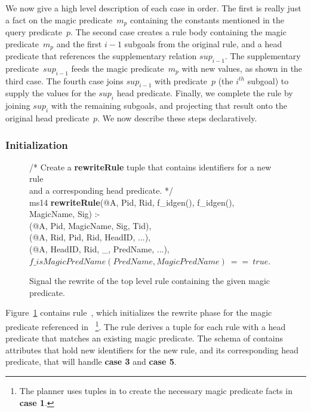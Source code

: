 We now give a high level description of each case in order.  The first is
really just a fact on the magic predicate~$m_p$ containing the constants
mentioned in the query predicate~$p$.  The second case creates a rule body
containing the magic predicate~$m_p$ and the first $i-1$ subgoals from the
original rule, and a head predicate that references the supplementary relation
$sup_{i-1}$.  The supplementary predicate~$sup_{i-1}$ feeds the magic
predicate~$m_p$ with new values, as shown in the third case.  The fourth case
joins $sup_{i-1}$ with predicate~$p$ (the $i^{th}$ subgoal) to supply the
values for the $sup_i$ head predicate.  Finally, we complete the rule by
joining $sup_i$ with the remaining subgoals, and projecting that result onto
the original head predicate~$p$.  We now describe these steps declaratively.

\subsubsection{Initialization}

\begin{figure}[!t]
\ssp
\centering
\begin{boxedminipage}{\linewidth}
/* Create a {\bf rewriteRule} tuple that contains identifiers for a new rule \\
and a corresponding head predicate. */ \\
ms14 {\bf rewriteRule}(@A, Pid, Rid, f\_idgen(), f\_idgen(), MagicName, Sig) :- \\
(@A, Pid, MagicName, Sig, Tid), \\
(@A, Rid, Pid, Rid, HeadID, ...), \\
(@A, HeadID, Rid, \_, PredName, ...), \\
\datalogspace $f\_isMagicPredName(PredName, MagicPredName)\ ==\ true$. \\
\end{boxedminipage}
\caption{\label{ch:magic:fig:rewrite1} Signal the rewrite of the top level rule 
containing the given magic predicate.}
\end{figure}

Figure~\ref{ch:magic:fig:rewrite1} contains rule~, which initializes
the rewrite phase for the magic predicate referenced in
~\footnote{The planner uses tuples in 
to create the necessary magic predicate facts in {\bf case 1}.}.  The rule
derives a  tuple for each rule with a head predicate that
matches an existing magic predicate.  The schema of  contains
attributes that hold new identifiers for the new rule, and its corresponding
head predicate, that will handle {\bf case 3} and {\bf case 5}.

